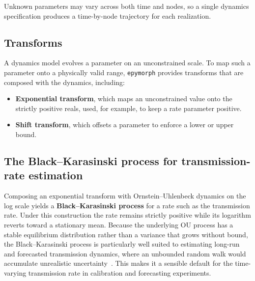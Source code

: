 Unknown parameters may vary across both time and nodes, so a single dynamics specification
produces a time-by-node trajectory for each realization.

\subsection{Transforms}

A dynamics model evolves a parameter on an unconstrained scale. To map such a parameter onto
a physically valid range, \texttt{epymorph} provides transforms that are composed with the
dynamics, including:

\begin{itemize}
\item
  \textbf{Exponential transform}, which maps an unconstrained value onto the strictly
  positive reals, used, for example, to keep a rate parameter positive.
\item
  \textbf{Shift transform}, which offsets a parameter to enforce a lower or upper bound.
\end{itemize}

\subsection{The Black--Karasinski process for transmission-rate estimation}

Composing an exponential transform with Ornstein--Uhlenbeck dynamics on the log scale yields
a \textbf{Black--Karasinski process} for a rate such as the transmission rate. Under this
construction the rate remains strictly positive while its logarithm reverts toward a
stationary mean. Because the underlying OU process has a stable equilibrium distribution
rather than a variance that grows without bound, the Black--Karasinski process is
particularly well suited to estimating long-run and forecasted transmission dynamics, where
an unbounded random walk would accumulate unrealistic uncertainty~\citep{drennan_estimating_2026}. This makes it a
sensible default for the time-varying transmission rate in calibration and forecasting
experiments.
